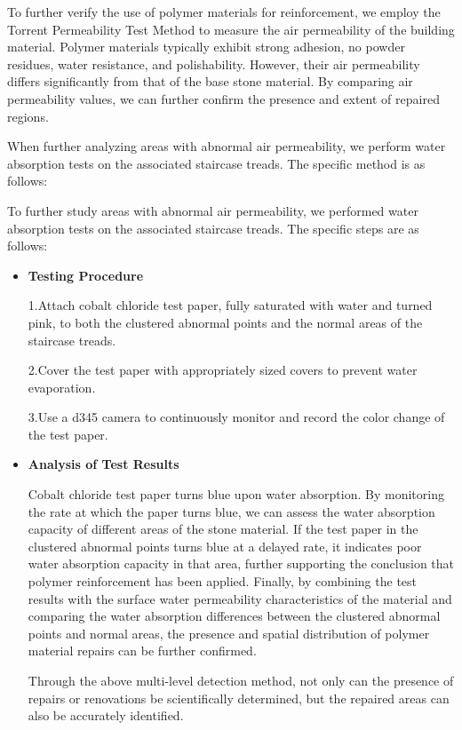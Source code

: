 \documentclass{mcmthesis}
\begin{document}
To further verify the use of polymer materials for reinforcement, we employ the Torrent Permeability Test Method to measure the air permeability of the building material\cite{sena2015non}. Polymer materials typically exhibit strong adhesion, no powder residues, water resistance, and polishability. However, their air permeability differs significantly from that of the base stone material. By comparing air permeability values, we can further confirm the presence and extent of repaired regions.

When further analyzing areas with abnormal air permeability, we perform water absorption tests on the associated staircase treads. The specific method is as follows:

To further study areas with abnormal air permeability, we performed water absorption tests on the associated staircase treads. The specific steps are as follows:

\begin{itemize}[label=$\diamond$]
\item \textbf{Testing Procedure}

1.Attach cobalt chloride test paper, fully saturated with water and turned pink, to both the clustered abnormal points and the normal areas of the staircase treads.

2.Cover the test paper with appropriately sized covers to prevent water evaporation.

3.Use a d345 camera to continuously monitor and record the color change of the test paper.


\item \textbf{Analysis of Test Results}


Cobalt chloride test paper turns blue upon water absorption. By monitoring the rate at which the paper turns blue, we can assess the water absorption capacity of different areas of the stone material.
If the test paper in the clustered abnormal points turns blue at a delayed rate, it indicates poor water absorption capacity in that area, further supporting the conclusion that polymer reinforcement has been applied.
Finally, by combining the test results with the surface water permeability characteristics of the material and comparing the water absorption differences 
between the clustered abnormal points and normal areas, the presence and spatial distribution of polymer material repairs can be further confirmed.

Through the above multi-level detection method, not only can the presence of repairs or renovations be scientifically determined, but the repaired areas can also be accurately identified.
\end{itemize}
\end{document}

